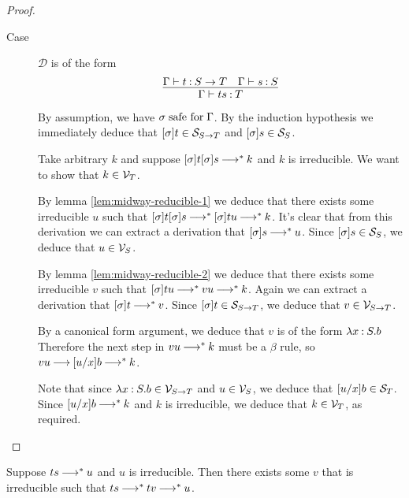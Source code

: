 \documentclass[11pt,letterpaper]{article}
\begin{document}
\begin{proof}
\begin{description}
    \item[Case] $\mathcal{D}$ is of the form
      \begin{equation*}
        \infer{\Gamma \proves t s \hastype T}{
          \Gamma \proves t \hastype S \to T
          &
          \Gamma \proves s \hastype S
        }
      \end{equation*}

      By assumption, we have $\sigma \safefor \Gamma$.
      By the induction hypothesis we immediately deduce that
      $[\sigma]t \in \S_{S \to T}$ and $[\sigma]s \in \S_S$.

      Take arbitrary $k$ and suppose $[\sigma]t [\sigma]s \evalto^* k$ and $k$
      is irreducible.
      We want to show that $k \in \V_T$.

      By lemma \ref{lem:midway-reducible-1} we deduce that there exists some
      irreducible $u$ such that
      $[\sigma]t [\sigma]s \evalto^* [\sigma]t u \evalto^* k$.
      It's clear that from this derivation we can extract a derivation that
      $[\sigma]s \evalto^* u$.
      Since $[\sigma]s \in \S_S$, we deduce that $u \in \V_S$.

      By lemma \ref{lem:midway-reducible-2} we deduce that there exists some
      irreducible $v$ such that
      $[\sigma]t u \evalto^* v u \evalto^* k$.
      Again we can extract a derivation that $[\sigma]t \evalto^* v$.
      Since $[\sigma]t \in \S_{S \to T}$, we deduce that $v \in \V_{S \to T}$.

      By a canonical form argument,
      we deduce that $v$ is of the form $\lambda x \hastype S. b$
      Therefore the next step in $v u \evalto^* k$ must be a $\beta$ rule, so
      $v u \evalto [u/x]b \evalto^* k$.

      Note that since $\lambda x \hastype S.b \in \V_{S \to T}$
      and $u \in \V_S$,
      we deduce that $[u/x]b \in \S_T$.
      Since $[u/x]b \evalto^* k$ and $k$ is irreducible, we deduce that
      $k \in \V_T$, as required.
  \end{description}

\end{proof}

\begin{lem}
  \label{lem:midway-reducible-1}
  Suppose $t s \evalto^* u$ and $u$ is irreducible.
  Then there exists some $v$ that is irreducible such that
  $t s \evalto^* t v \evalto^* u$.
\end{lem}
\end{document}
